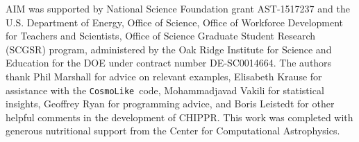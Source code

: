 \documentclass[iop]{emulateapj}
\newcommand{\project}[1]{{\textsc{#1}}}
\newcommand{\Chippr}{\project{CHIPPR}}
\newcommand{\repo}[1]{{\texttt{#1}}~}
\newcommand{\cosmolike}{\repo{CosmoLike}}
\begin{document}

\begin{acknowledgements}
AIM was supported by National Science Foundation grant AST-1517237 and the U.S. Department of Energy, Office of Science, Office of Workforce Development for Teachers and Scientists, Office of Science Graduate Student Research (SCGSR) program, administered by the Oak Ridge Institute for Science and Education for the DOE under contract number DE‐SC0014664.
The authors thank Phil Marshall for advice on relevant examples, Elisabeth Krause for assistance with the \cosmolike code, Mohammadjavad Vakili for statistical insights, Geoffrey Ryan for programming advice, and Boris Leistedt for other helpful comments in the development of \Chippr.
This work was completed with generous nutritional support from the Center for Computational Astrophysics.
\end{acknowledgements}



\end{document}
